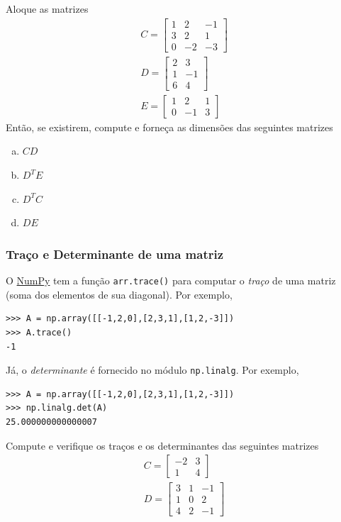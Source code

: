 \documentclass[12pt]{article}
\begin{document}
\begin{exr}
  Aloque as matrizes
  \begin{gather}
    C =
    \begin{bmatrix}
      1 & 2 & -1 \\
      3 & 2 & 1 \\
      0 & -2 & -3
    \end{bmatrix}\\
    D =
    \begin{bmatrix}
      2 & 3 \\
      1 & -1 \\
      6 & 4
    \end{bmatrix}\\
    E =
    \begin{bmatrix}
      1 & 2 & 1 \\
      0 & -1 & 3
    \end{bmatrix}
  \end{gather}
  Então, se existirem, compute e forneça as dimensões das seguintes matrizes
  \begin{enumerate}[a)]
  \item $CD$
  \item $D^TE$
  \item $D^TC$
  \item $DE$
  \end{enumerate}
\end{exr}

\subsubsection{Traço e Determinante de uma matriz}

O \href{https://numpy.org/}{NumPy} tem a função \lstinline+arr.trace()+ para computar o \emph{traço} de uma matriz (soma dos elementos de sua diagonal). Por exemplo,
\begin{lstlisting}
>>> A = np.array([[-1,2,0],[2,3,1],[1,2,-3]])
>>> A.trace()
-1
\end{lstlisting}
Já, o \emph{determinante} é fornecido no módulo \lstinline+np.linalg+. Por exemplo,
\begin{lstlisting}
>>> A = np.array([[-1,2,0],[2,3,1],[1,2,-3]])
>>> np.linalg.det(A)
25.000000000000007
\end{lstlisting}

\begin{exr}
  Compute e verifique os traços e os determinantes das seguintes matrizes
  \begin{gather}
    C =
    \begin{bmatrix}
      -2 & 3 \\
      1 & 4
    \end{bmatrix}\\
    D =
    \begin{bmatrix}
      3 & 1 & -1 \\
      1 & 0 & 2 \\
      4 & 2 & -1
    \end{bmatrix}
  \end{gather}
\end{exr}
\end{document}
